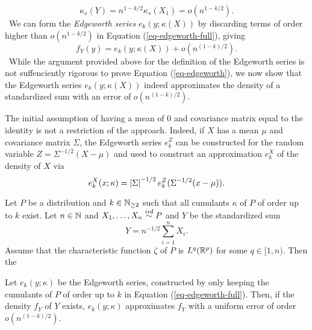 \begin{equation*}
    \kappa_s(Y) = n^{1-k/2} \kappa_s(X_1) = o(n^{1-k/2}).
\end{equation*}
\
We can form the \textit{Edgeworth series} $e_k(y; \kappa(X))$ by discarding terms of order higher than $o(n^{1-k/2})$ in Equation (\ref{eq-edgeworth-full}), giving
\begin{equation} \label{eq-edgeworth}
    f_Y(y) = e_k(y; \kappa(X)) + o(n^{(1-k)/2}).
\end{equation}
\
While the argument provided above for the definition of the Edgeworth series is not suffenciently rigorous to prove Equation (\ref{eq-edgeworth}), we now show that the Edgeworth series $e_k(y; \kappa(X))$ indeed approximates the density of a standardized sum with an error of $o(n^{(1-k)/2})$.

\begin{remark} \label{rem-centering}
    The initial assumption of having a mean of 0 and covariance matrix equal to the identity is not a restriction of the approach. Indeed, if $X$ has a mean $\mu$ and covariance matrix $\Sigma$, the Edgeworth series $e_k^Z$ can be constructed for the random variable $Z = \Sigma^{-1/2}(X - \mu)$ and used to construct an approximation $e^X_k$ of the density of $X$ via
    \begin{equation*}
        e^X_k(x; \kappa) = \left|\Sigma\right|^{-1/2} e_k^Z(\Sigma^{-1/2}(x - \mu)).
    \end{equation*}
\end{remark}

\begin{theorem} \label{thm-edgeworth}
    Let $P$ be a distribution and $k \in \mathbb{N}_{\geq 2}$ such that all cumulants $\kappa$ of $P$ of order up to $k$ exist. Let $n \in \mathbb{N}$ and $X_1, \ldots, X_n \stackrel{iid}{\sim} P$ and $Y$ be the standardized sum
    \begin{equation*}
        Y = n^{-1/2}\sum_{i=1}^n X_i.
    \end{equation*}
    Assume that the characteristic function $\zeta$ of $P$ is $L^q({\mathbb{R}^p})$ for some $q \in [1, n)$. Then the
    
    Let $e_k(y; \kappa)$ be the Edgeworth series, constructed by only keeping the cumulants of $P$ of order up to $k$ in Equation (\ref{eq-edgeworth-full}). Then, if the density $f_Y$ of $Y$ exists, $e_k(y; \kappa)$ approximates $f_Y$ with a uniform error of order $o(n^{(1 - k)/2})$.
\end{theorem}

